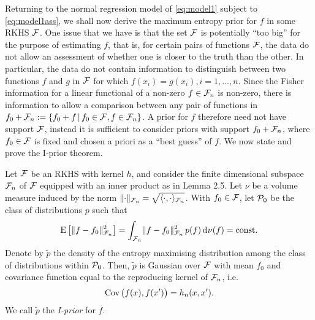 Returning to the normal regression model of \cref{eq:model1} subject to \cref{eq:model1ass}, we shall now derive the maximum entropy prior for $f$ in some RKHS ${\mathcal F}$.
One issue that we have is that the set ${\mathcal F}$ is potentially ``too big'' for the purpose of estimating $f$, that is, for certain pairs of functions ${\mathcal F}$, the data do not allow an assessment of whether one is closer to the truth than the other.
In particular, the data do not contain information to distinguish between two functions $f$ and $g$ in ${\mathcal F}$ for which $f(x_i) = g(x_i), i=1,\dots,n$.
Since the Fisher information for a linear functional of a non-zero $f \in {\mathcal F}_n$ is non-zero, there is information to allow a comparison between any pair of functions in $f_0 + {\mathcal F}_n := \{f_0 + f \,|\, f_0 \in {\mathcal F}, f \in {\mathcal F}_n \}$.
A prior for $f$ therefore need not have support ${\mathcal F}$, instead it is sufficient to consider priors with support $f_0 + {\mathcal F}_n$, where $f_0 \in {\mathcal F}$ is fixed and chosen a priori as a ``best guess'' of $f$.
We now state and prove the I-prior theorem.

\begin{theorem}
  Let ${\mathcal F}$ be an RKHS with kernel $h$, and consider the finite dimensional subspace ${\mathcal F}_n$ of ${\mathcal F}$ equipped with an inner product as in Lemma 2.5.
  Let $\nu$ be a volume measure induced by the norm $\lVert\cdot\rVert_{{\mathcal F}_n} = \sqrt{\langle\cdot,\cdot\rangle_{{\mathcal F}_n}}$.
  With $f_0 \in {\mathcal F}$, let ${\mathcal P}_0$ be the class of distributions $p$ such that 
  \[
    \operatorname{E}\big[\lVert f-f_0\rVert^2_{{\mathcal F}_n}\big] = \int_{{\mathcal F}_n} \lVert f-f_0\rVert^2_{{\mathcal F}_n} \, p(f) \operatorname{d}\hspace{0.5pt}\! \nu(f) = \text{const.}\hspace{0.01em}
  \]
  Denote by $\tilde p$ the density of the entropy maximising distribution among the class of distributions within ${\mathcal P}_0$.
  Then, $\tilde p$ is Gaussian over ${\mathcal F}$ with mean $f_0$ and covariance function equal to the reproducing kernel of ${\mathcal F}_n$, i.e.
  \[
    \operatorname{Cov}\big(f(x),f(x')\big) = h_n(x,x').
  \]
  We call $\tilde p$ the \emph{I-prior} for $f$.
\end{theorem}

